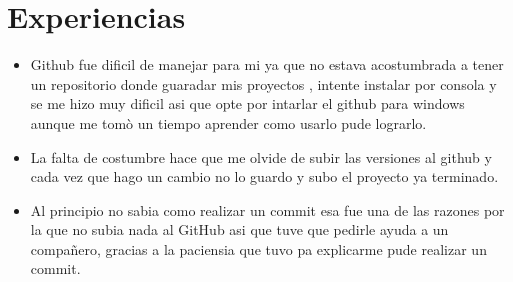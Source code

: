  \section{ Experiencias}
\begin{itemize}
 \item Github fue dificil de manejar  para mi ya que no estava acostumbrada a tener un repositorio donde guaradar mis proyectos , intente instalar por consola y se me hizo muy dificil asi que opte por intarlar el github para windows aunque me tomò un tiempo aprender como usarlo pude lograrlo. 
 \item La falta de costumbre hace que me olvide de subir las versiones al github y cada vez que hago un cambio no lo guardo y subo el proyecto ya terminado.
\item Al principio no sabia como realizar un commit esa fue  una de las razones por la que no subia nada al GitHub asi que tuve que pedirle ayuda a un compañero, gracias a la paciensia que tuvo pa explicarme pude realizar un commit.
\end{itemize}

%

